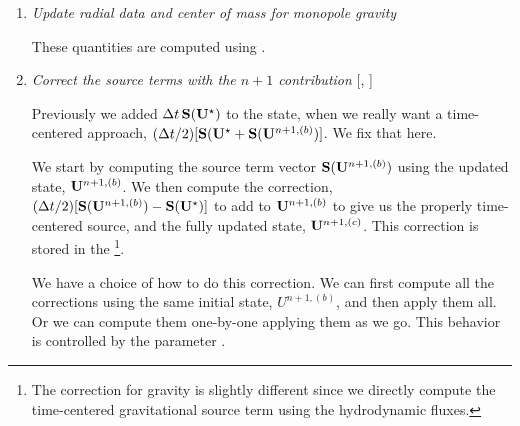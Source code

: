 \begin{enumerate}
  There are many ways that the hydrodynamics state may become
  unphysical in the evolution.  The  routine
  enforces some checks on the state.  In particular, it
  \begin{enumerate}
  \item enforces that the density is above 
  \item normalizes the species so that the mass fractions sum to 1
  \item resets the internal energy if necessary (too small or negative)
    and computes the temperature for all zones to be thermodynamically 
    consistent with the state.
  \end{enumerate}
  This is done on .

  After these checks, we check the state for NaNs.

\item \label{strang:radial} {\em Update radial data and center of mass for monopole gravity}

 These quantities are computed using .



\item \label{strang:newsource} {\em Correct the source terms with the $n+1$ contribution}
  [, ]

  Previously we added $\Delta t\, {\bf S}({\bf U}^\star)$ to the state, when
  we really want a time-centered approach, $(\Delta t/2)[{\bf S}({\bf U}^\star
    + {\bf S}({\bf U}^{n+1,(b)})]$.  We fix that here.

  We start by computing the source term vector ${\bf S}({\bf U}^{n+1,(b)})$
  using the updated state, ${\bf U}^{n+1,(b)}$.  We then compute the
  correction, $(\Delta t/2)[{\bf S}({\bf U}^{n+1,(b)}) - {\bf S}({\bf U}^\star)]$ to
  add to ${\bf U}^{n+1,(b)}$ to give us the properly time-centered source,
  and the fully updated state, ${\bf U}^{n+1,(c)}$.  This correction is stored
  in the  \multifab\footnote{The correction for gravity is slightly different since we directly compute the time-centered gravitational source term using the hydrodynamic fluxes.}.

  We have a choice of how to do this correction.  We can first compute
  all the corrections using the same initial state, $U^{n+1,(b)}$,
  and then apply them all.  Or we can compute them one-by-one applying
  them as we go.  This behavior is controlled by the parameter
  .


\end{enumerate}
